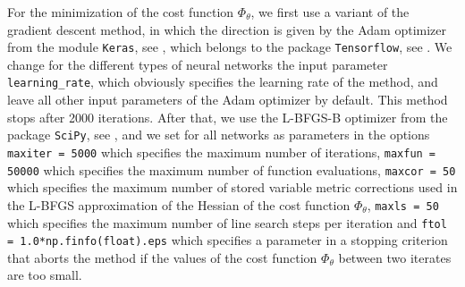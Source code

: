 For the minimization of the cost function $\Phi_{\theta}$, we first use a variant of the gradient descent method, in which the direction is given by the Adam optimizer from the module \lstinline!Keras!, see \cite{Chollet:2015}, which belongs to the package \lstinline!Tensorflow!, see \cite{TensorFlow}. We change for the different types of neural networks the input parameter \lstinline!learning_rate!, which obviously specifies the learning rate of the method, and leave all other input parameters of the Adam optimizer by default. This method stops after 2000 iterations. After that, we use the L-BFGS-B optimizer from the package \lstinline!SciPy!, see \cite{SciPy:2020}, and we set for all networks as parameters in the options \lstinline!maxiter = 5000! which specifies the maximum number of iterations, \lstinline!maxfun = 50000! which specifies the maximum number of function evaluations, \lstinline!maxcor = 50! which specifies the maximum number of stored variable metric corrections used in the L-BFGS approximation of the Hessian of the cost function $\Phi_{\theta}$, \lstinline!maxls = 50! which specifies the maximum number of line search steps per iteration and \lstinline!ftol = 1.0*np.finfo(float).eps! which specifies a parameter in a stopping criterion that aborts the method if the values of the cost function $\Phi_{\theta}$ between two iterates are too small.


\begin{table}[H]\label{tab:one_cost_function}
    \caption{Comparison of different types of neural networks.}
\end{table}